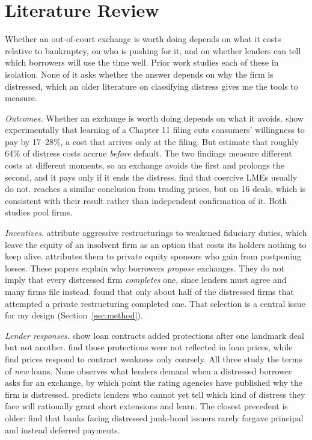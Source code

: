 \documentclass[12pt]{article}
\begin{document}
\section{Literature Review}

Whether an out-of-court exchange is worth doing depends on what it costs relative to bankruptcy, on who is pushing for it, and on whether lenders can tell which borrowers will use the time well. Prior work studies each of these in isolation. None of it asks whether the answer depends on why the firm is distressed, which an older literature on classifying distress gives me the tools to measure.

\emph{Outcomes.} Whether an exchange is worth doing depends on what it avoids. \citet{antill2026} show experimentally that learning of a Chapter 11 filing cuts consumers' willingness to pay by 17--28\%, a cost that arrives only at the filing. But \citet{elkamhi2024} estimate that roughly 64\% of distress costs accrue \emph{before} default. The two findings measure different costs at different moments, so an exchange avoids the first and prolongs the second, and it pays only if it ends the distress. \citet{roerotaru2026} find that coercive LMEs usually do not. \citet{harmon2026} reaches a similar conclusion from trading prices, but on 16 deals, which is consistent with their result rather than independent confirmation of it. Both studies pool firms.

\emph{Incentives.} \citet{ellias2020} attribute aggressive restructurings to weakened fiduciary duties, which leave the equity of an insolvent firm as an option that costs its holders nothing to keep alive. \citet{buccola2023} attributes them to private equity sponsors who gain from postponing losses. These papers explain why borrowers \emph{propose} exchanges. They do not imply that every distressed firm \emph{completes} one, since lenders must agree and many firms file instead. \citet{gilson1990} found that only about half of the distressed firms that attempted a private restructuring completed one. That selection is a central issue for my design (Section~\ref{sec:method}).

\emph{Lender responses.} \citet{buccolanini2024} show loan contracts added protections after one landmark deal but not another. \citet{badawi2024} find those protections were not reflected in loan prices, while \citet{ivashina2025} find prices respond to contract weakness only coarsely. All three study the terms of \emph{new} loans. None observes what lenders demand when a distressed borrower asks for an exchange, by which point the rating agencies have published why the firm is distressed. \citet{kahl2002} predicts lenders who cannot yet tell which kind of distress they face will rationally grant short extensions and learn. The closest precedent is older: \citet{asquith1994} find that banks facing distressed junk-bond issuers rarely forgave principal and instead deferred payments.
\end{document}
